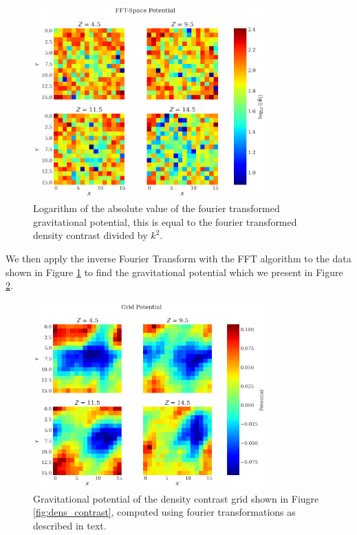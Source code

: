 \begin{figure}
    \centering
    \includegraphics[width=0.8\textwidth]{results/fft_potential.png}
    \caption{Logarithm of the absolute value of the fourier transformed gravitational potential, this is equal to the fourier transformed density contrast divided by $k^2$.}
    \label{fig:fft_potential}
\end{figure}

We then apply the inverse Fourier Transform with the FFT algorithm to the data shown in Figure \ref{fig:fft_potential} to find the gravitational potential which we present in Figure \ref{fig:potential}.

\begin{figure}
    \centering
    \includegraphics[width=0.8\textwidth]{results/potential_slices.png}    
    \caption{Gravitational potential of the density contrast grid shown in Fiugre \ref{fig:dens_contrast}, computed using fourier transformations as described in text.}
    \label{fig:potential}
\end{figure}

